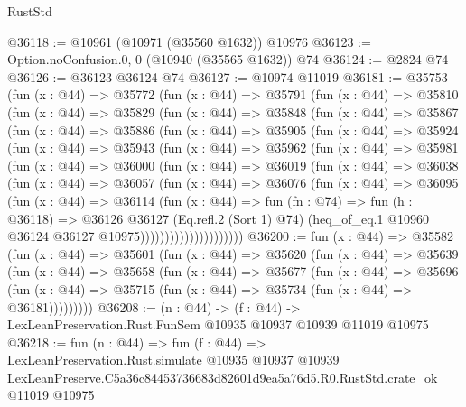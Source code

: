 \begin{lexlean}{RustStd}
\begin{coremodule}
@36118 := @10961 (@10971 (@35560 @1632)) @10976
@36123 := Option.noConfusion.{0, 0} (@10940 (@35565 @1632)) @74
@36124 := @2824 @74
@36126 := @36123 @36124 @74
@36127 := @10974 @11019
@36181 := @35753
    (fun (x : @44) =>
    @35772
      (fun (x : @44) =>
      @35791
        (fun (x : @44) =>
        @35810
          (fun (x : @44) =>
          @35829
            (fun (x : @44) =>
            @35848
              (fun (x : @44) =>
              @35867
                (fun (x : @44) =>
                @35886
                  (fun (x : @44) =>
                  @35905
                    (fun (x : @44) =>
                    @35924
                      (fun (x : @44) =>
                      @35943
                        (fun (x : @44) =>
                        @35962
                          (fun (x : @44) =>
                          @35981
                            (fun (x : @44) =>
                            @36000
                              (fun (x : @44) =>
                              @36019
                                (fun (x : @44) =>
                                @36038
                                  (fun (x : @44) =>
                                  @36057
                                    (fun (x : @44) =>
                                    @36076
                                      (fun (x : @44) =>
                                      @36095
                                        (fun (x : @44) =>
                                        @36114
                                          (fun (x : @44) =>
                                          fun (fn : @74) =>
                                          fun (h : @36118) =>
                                          @36126
                                            @36127
                                            (Eq.refl.{2} (Sort 1) @74)
                                            (heq_of_eq.{1}
                                              @10960
                                              @36124
                                              @36127
                                              @10975)))))))))))))))))))))
@36200 := fun (x : @44) =>
  @35582
    (fun (x : @44) =>
    @35601
      (fun (x : @44) =>
      @35620
        (fun (x : @44) =>
        @35639
          (fun (x : @44) =>
          @35658
            (fun (x : @44) =>
            @35677
              (fun (x : @44) =>
              @35696
                (fun (x : @44) => @35715 (fun (x : @44) => @35734 (fun (x : @44) => @36181)))))))))
@36208 := (n : @44) ->
  (f : @44) -> LexLeanPreservation.Rust.FunSem @10935 @10937 @10939 @11019 @10975
@36218 := fun (n : @44) =>
  fun (f : @44) =>
  LexLeanPreservation.Rust.simulate
    @10935
    @10937
    @10939
    LexLeanPreserve.C5a36c84453736683d82601d9ea5a76d5.R0.RustStd.crate_ok
    @11019
    @10975
\end{coremodule}
\end{lexlean}
